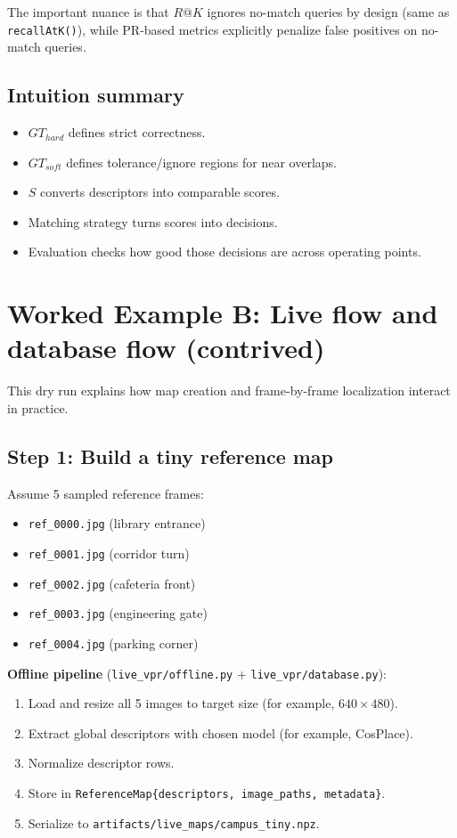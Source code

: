\documentclass[11pt]{article}
\newcommand{\file}[1]{\texttt{#1}}
\begin{document}
The important nuance is that $R@K$ ignores no-match queries by design (same as \file{recallAtK()}), while PR-based metrics explicitly penalize false positives on no-match queries.

\subsection{Intuition summary}
\begin{itemize}[leftmargin=*]
  \item $GT_{hard}$ defines strict correctness.
  \item $GT_{soft}$ defines tolerance/ignore regions for near overlaps.
  \item $S$ converts descriptors into comparable scores.
  \item Matching strategy turns scores into decisions.
  \item Evaluation checks how good those decisions are across operating points.
\end{itemize}

\section{Worked Example B: Live flow and database flow (contrived)}
This dry run explains how map creation and frame-by-frame localization interact in practice.

\subsection{Step 1: Build a tiny reference map}
Assume 5 sampled reference frames:
\begin{itemize}[leftmargin=*]
  \item \file{ref\_0000.jpg} (library entrance)
  \item \file{ref\_0001.jpg} (corridor turn)
  \item \file{ref\_0002.jpg} (cafeteria front)
  \item \file{ref\_0003.jpg} (engineering gate)
  \item \file{ref\_0004.jpg} (parking corner)
\end{itemize}

\textbf{Offline pipeline} (\file{live\_vpr/offline.py} + \file{live\_vpr/database.py}):
\begin{enumerate}[leftmargin=*]
  \item Load and resize all 5 images to target size (for example, $640\times480$).
  \item Extract global descriptors with chosen model (for example, CosPlace).
  \item Normalize descriptor rows.
  \item Store in \texttt{ReferenceMap\{descriptors, image\_paths, metadata\}}.
  \item Serialize to \file{artifacts/live\_maps/campus\_tiny.npz}.
\end{enumerate}
\end{document}
